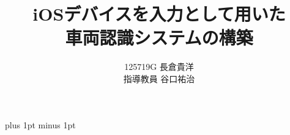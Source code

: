 \documentclass[a4j,12pt]{jreport}
\title{iOSデバイスを入力として用いた\\
車両認識システムの構築}
\author{125719G 長倉貴洋 \\ 指導教員 {谷口祐治}}
\begin{document}
\maketitle
\baselineskip 17pt plus 1pt minus 1pt

\setcounter{page}{0}

\tableofcontents
\listoffigures
\listoftables









%




\end{document}
